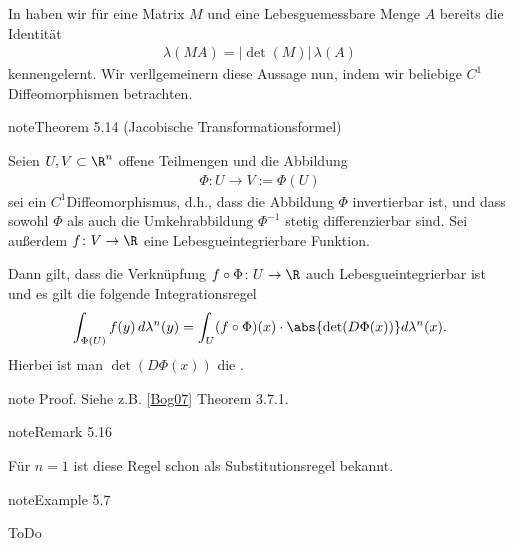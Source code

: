 \documentclass[letterpaper,10pt,german]{jupyterBook}
\begin{document}
\sphinxAtStartPar
In {\hyperref[\detokenize{masstheorie/masstheorie:rem:transinvariance}]{}} haben wir für eine Matrix \(M\) und eine Lebesgue\sphinxhyphen{}messbare Menge \(A\) bereits die Identität
\begin{equation*}
\begin{split}\lambda(MA) = |\det(M)| \, \lambda(A)\end{split}
\end{equation*}
\sphinxAtStartPar
kennengelernt. Wir verllgemeinern diese Aussage nun, indem wir beliebige \(C^1\)\sphinxhyphen{}Diffeomorphismen betrachten.
\label{masstheorie/integrationstechnik:thm:jacobitransformation}
\begin{sphinxadmonition}{note}{Theorem 5.14 (Jacobische Transformationsformel)}



\sphinxAtStartPar
Seien \(U, V \subset \R^n\) offene Teilmengen und die Abbildung
\begin{equation*}
\begin{split}\Phi \colon U \rightarrow V := \Phi(U)\end{split}
\end{equation*}
\sphinxAtStartPar
sei ein \(C^1\)\sphinxhyphen{}Diffeomorphismus, d.h., dass die Abbildung \(\Phi\) invertierbar ist, und dass sowohl \(\Phi\) als auch die Umkehrabbildung \(\Phi^{-1}\) stetig differenzierbar sind.
Sei außerdem \(f \colon V \rightarrow \R\) eine Lebesgue\sphinxhyphen{}integrierbare Funktion.

\sphinxAtStartPar
Dann gilt, dass die Verknüpfung \(f \circ \Phi \colon U \rightarrow \R\) auch Lebesgue\sphinxhyphen{}integrierbar ist und es gilt die folgende Integrationsregel
\begin{equation*}
\begin{split}\int_{\Phi(U)} f(y)\,d\lambda^n(y) = \int_U (f \circ \Phi)(x) \cdot \abs{\det(D\Phi(x))} d\lambda^n(x). \end{split}
\end{equation*}
\sphinxAtStartPar
Hierbei ist man \(\det(D\Phi(x))\) die .
\end{sphinxadmonition}

\begin{sphinxadmonition}{note}
\sphinxAtStartPar
Proof. Siehe z.B. {[}\hyperlink{cite.references:id5}{Bog07}{]} Theorem 3.7.1.
\end{sphinxadmonition}
\label{masstheorie/integrationstechnik:remark-24}
\begin{sphinxadmonition}{note}{Remark 5.16}



\sphinxAtStartPar
Für \(n=1\) ist diese Regel schon als Substitutionsregel bekannt.
\end{sphinxadmonition}
\label{masstheorie/integrationstechnik:example-25}
\begin{sphinxadmonition}{note}{Example 5.7}



\sphinxAtStartPar
ToDo
\end{sphinxadmonition}
\end{document}
